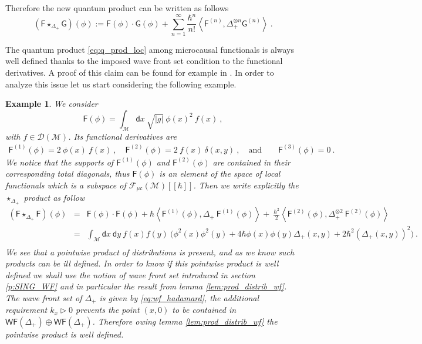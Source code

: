 \documentclass[11pt]{book}
\newcommand{\WF}{\mathsf{WF}}
\newcommand{\muc}{\mu\csf}
\newcommand{\abs}[1]{\left|#1\right|}
\newcommand{\sm}[1]{\left\langle#1\right\rangle}
\newcommand{\Dcal}{\mathcal{D}}
\newcommand{\Fcal}{\mathcal{F}}
\newcommand{\Mcal}{\mathcal{M}}
\newcommand{\Fsf}{\mathsf{F}}
\newcommand{\Gsf}{\mathsf{G}}
\newcommand{\csf}{\mathsf{c}}
\newcommand{\dsf}{\mathsf{d}}
\theoremstyle{break}
\newtheorem{example}{Example}[chapter]
\begin{document}
Therefore the new quantum product can be written as follows 
%
\begin{equation}
(\Fsf \star_{\Delta_+} \Gsf)(\phi) := \Fsf(\phi) \cdot \Gsf(\phi) + \sum_{n=1}^\infty \frac{\hbar^n}{n!} \sm{ \Fsf^{(n)} , \Delta_+^{\otimes n} \Gsf^{(n) } } \ .
\label{eq:q_prod_loc}
\end{equation}


The quantum product \eqref{eq:q_prod_loc} among microcausal functionals is always well defined thanks to the imposed wave front set condition to the functional derivatives. A proof of this claim can be found for example in \cite{HW_2003}. In order to analyze this issue let us start considering the following example.


\begin{example}
We consider 
%
\begin{equation}
\Fsf(\phi) = \int_\Mcal \dsf x \ \sqrt{\abs{g}} \ \phi(x)^2 \ f(x)  \ ,
\label{eq:exo_loc_obs}
\end{equation}
%
with $f \in \Dcal(\Mcal)$. Its functional derivatives are
%
\begin{eqnarray*}
\Fsf^{(1)}(\phi) = 2 \ \phi(x) \ f(x) \ , \quad \Fsf^{(2)}(\phi) = 2 \ f(x) \ \delta(x,y) \ , \quad \mbox{and} \qquad \Fsf^{(3)}(\phi) = 0 \ .
\end{eqnarray*}
%
We notice that the supports of $\Fsf^{(1)}(\phi)$ and $\Fsf^{(2)}(\phi)$ are contained in their corresponding total diagonals, thus $\Fsf(\phi)$ is an element of the space of local functionals which is a subspace of $\Fcal_{\muc}(\Mcal)[[\hbar]]$. 
%
Then we write explicitly the $\star_{\Delta_+}$ product as follow
%
\begin{eqnarray}
(\Fsf \star_{\Delta_+} \Fsf)(\phi) &=& \Fsf(\phi) \cdot \Fsf(\phi) + \hbar \sm{ \Fsf^{(1)}(\phi) , \Delta_+ \ \Fsf^{(1)}(\phi) } + \ \frac{\hbar^2}{2} \sm{ \Fsf^{(2)}(\phi) , \Delta_+^{\otimes 2} \ \Fsf^{(2)}(\phi)} \nonumber \\
%
&=& \int_\Mcal \dsf x \ \dsf y \ f(x) f(y) \ \bigg( \phi^2(x) \phi^2(y) + 4 \hbar \phi(x) \phi(y) \Delta_+(x,y) + 2 \hbar^2 \left(\Delta_+(x,y)\right)^2 \bigg) \ . \nonumber \\
\label{eq:exo_loc_obs_prod_q}
\end{eqnarray}
%
We see that a pointwise product of distributions is present, and as we know such products can be ill defined. In order to know if this pointwise product is well defined we shall use the notion of wave front set introduced in section \ref{p:SING_WF} and in particular the result from lemma \ref{lem:prod_distrib_wf}. The wave front set of $\Delta_+$ is given by \eqref{eq:wf_hadamard}, the additional requirement $k_x \triangleright 0$ prevents the point $(x,0)$ to be contained in $\WF(\Delta_+) \oplus \WF(\Delta_+)$. Therefore owing lemma \ref{lem:prod_distrib_wf} the pointwise product is well defined.
\end{example}
\end{document}
